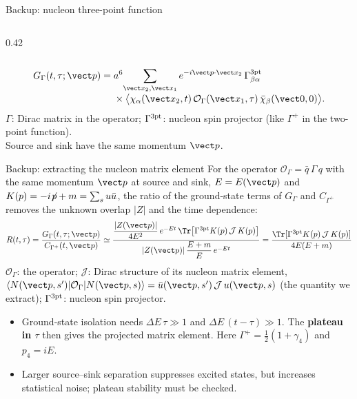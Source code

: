\begin{frame}{Backup: nucleon three-point function}
\begin{columns}[c]
\begin{column}{0.42\textwidth}
    \end{column}
  \end{columns}
  \vspace{1mm}
  \[
    \begin{aligned}
      G_\Gamma(t,\tau;\vect p)={}&a^6\!\sum_{\vect x_2,\vect x_1}
      e^{-i\vect p\cdot\vect x_2}
      \,\Gamma^{\rm 3pt}_{\beta\alpha}\\[-1mm]
      &\times\big\langle\chi_\alpha(\vect x_2,t)\,
      \mathcal O_\Gamma(\vect x_1,\tau)\,\bar\chi_\beta(\vect 0,0)\big\rangle .
    \end{aligned}
  \]
  \centering
  {\small $\Gamma$: Dirac matrix in the operator;\quad
    $\Gamma^{\rm 3pt}$: nucleon spin projector (like $\Gamma^+$ in the two-point function).\\
    Source and sink have the same momentum $\vect p$.}
\end{frame}

\begin{frame}{Backup: extracting the nucleon matrix element}
  For the operator $\mathcal O_\Gamma=\bar q\,\Gamma\,q$ with the same momentum $\vect p$ at source and sink, $E=E(\vect p)$ and $K(p)=-i{\not\!p}+m=\sum_s u\bar u$, the ratio of the ground-state terms of $G_\Gamma$ and $C_{\Gamma^+}$ removes the unknown overlap $|Z|$ and the time dependence:
  \[
    R(t,\tau)=\frac{G_\Gamma(t,\tau;\vect p)}{C_{\Gamma^+}(t,\vect p)}
    \simeq
    \frac{\dfrac{|Z(\vect p)|}{4E^2}\,e^{-Et}\,\Tr\!\left[\Gamma^{\rm 3pt}K(p)\,\mathcal J\,K(p)\right]}
         {|Z(\vect p)|\,\dfrac{E+m}{E}\,e^{-Et}}
    =\frac{\Tr[\Gamma^{\rm 3pt}K(p)\,\mathcal J\,K(p)]}{4E(E+m)}
  \]
  {\small $\mathcal O_\Gamma$: the operator;\quad
    $\mathcal J$: Dirac structure of its nucleon matrix element,
    $\langle N(\vect p,s')|\mathcal O_\Gamma|N(\vect p,s)\rangle=\bar u(\vect p,s')\,\mathcal J\,u(\vect p,s)$ (the quantity we extract);\quad
    $\Gamma^{\rm 3pt}$: nucleon spin projector.}
  \begin{itemize}
    \item Ground-state isolation needs $\Delta E\,\tau\gg1$ and $\Delta E\,(t-\tau)\gg1$.
      The \textbf{plateau in $\tau$} then gives the projected matrix element.
      Here $\Gamma^+=\tfrac12(1+\gamma_4)$ and $p_4=iE$.
    \item Larger source--sink separation suppresses excited states, but increases
      statistical noise; plateau stability must be checked.
  \end{itemize}
\end{frame}

